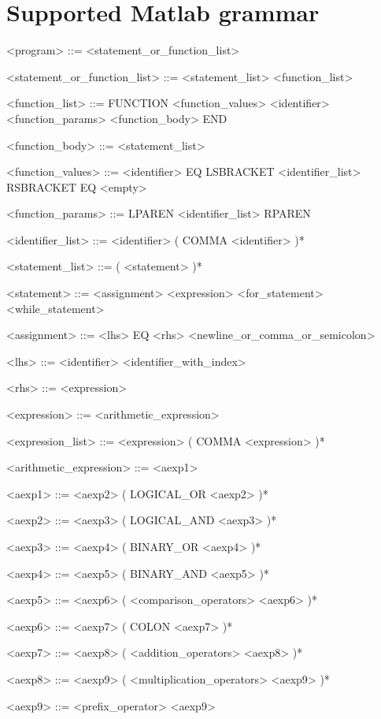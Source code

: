 \documentclass{article}
\begin{document}
\section{Supported Matlab grammar}

\begin{grammar}
	<program> ::= <statement_or_function_list>
	
	<statement_or_function_list> ::= <statement_list> \alt <function_list>
	
	<function_list> ::= FUNCTION <function_values> <identifier> <function_params> <function_body> END
	
	<function_body> ::= <statement_list>
	
	<function_values> ::= <identifier> EQ \alt LSBRACKET <identifier_list> RSBRACKET EQ \alt <empty>
	
	<function_params> ::= LPAREN <identifier_list> RPAREN
	
	<identifier_list> ::= <identifier> ( COMMA <identifier> )*
	
	<statement_list> ::= ( <statement> )*
	
	<statement> ::= <assignment> \alt <expression> \alt <for_statement> \alt <while_statement>
	
	<assignment> ::= <lhs> EQ <rhs> <newline_or_comma_or_semicolon>
	
	<lhs> ::= <identifier> \alt <identifier_with_index>
	
	<rhs> ::= <expression>
	
	<expression> ::= <arithmetic_expression>
	
	<expression_list> ::= <expression> ( COMMA <expression> )*
	
	<arithmetic_expression> ::= <aexp1>
	
	<aexp1> ::= <aexp2> ( LOGICAL_OR <aexp2> )*
	
	<aexp2> ::= <aexp3> ( LOGICAL_AND <aexp3> )*
	
	<aexp3> ::= <aexp4> ( BINARY_OR <aexp4> )*
	
	<aexp4> ::= <aexp5> ( BINARY_AND <aexp5> )*
	
	<aexp5> ::= <aexp6> ( <comparison_operators> <aexp6> )*
	
	<aexp6> ::= <aexp7> ( COLON <aexp7> )*
	
	<aexp7> ::= <aexp8> ( <addition_operators> <aexp8> )*
	
	<aexp8> ::= <aexp9> ( <multiplication_operators> <aexp9> )*
	
	<aexp9> ::= <prefix_operator> <aexp9> \alt <aexp10>
	

\end{grammar}
\end{document}
